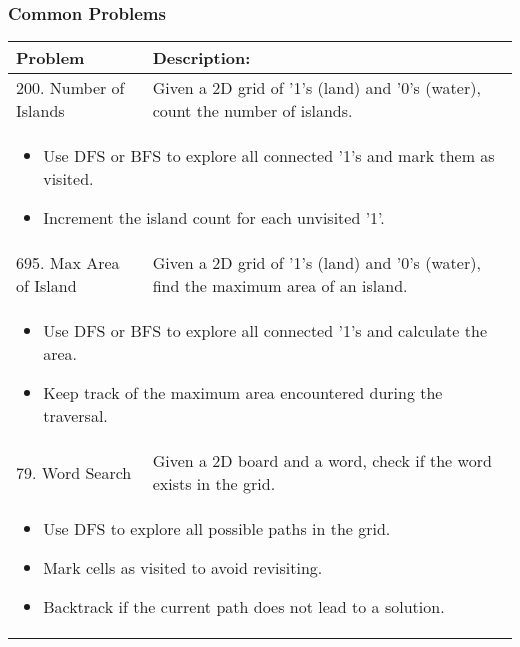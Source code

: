 \subsubsection{Common Problems}
\begin{summary}
    \begin{center}
        \begin{tabular}{ll}
            \toprule
            \textbf{Problem} & \textbf{Description:} \\
            \midrule
            200. Number of Islands & Given a 2D grid of '1's (land) and '0's (water), count the number of islands. \\
            \multicolumn{2}{p{\linewidth}}{
                \begin{itemize}
                    \item Use DFS or BFS to explore all connected '1's and mark them as visited.
                    \item Increment the island count for each unvisited '1'.
                \end{itemize}
            } \\
            \midrule
            695. Max Area of Island & Given a 2D grid of '1's (land) and '0's (water), find the maximum area of an island. \\
            \multicolumn{2}{p{\linewidth}}{
                \begin{itemize}
                    \item Use DFS or BFS to explore all connected '1's and calculate the area.
                    \item Keep track of the maximum area encountered during the traversal.
                \end{itemize}
            } \\
            \midrule
            79. Word Search & Given a 2D board and a word, check if the word exists in the grid. \\
            \multicolumn{2}{p{\linewidth}}{
                \begin{itemize}
                    \item Use DFS to explore all possible paths in the grid.
                    \item Mark cells as visited to avoid revisiting.
                    \item Backtrack if the current path does not lead to a solution.
                \end{itemize}
            } \\
        \end{tabular}
    \end{center}
\end{summary}